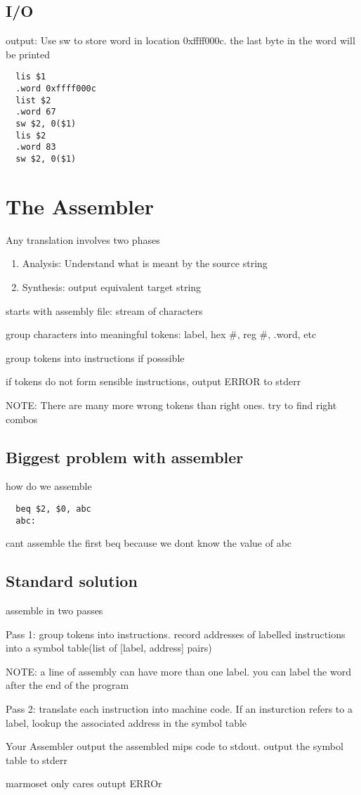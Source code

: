 \documentclass[11pt]{amsart}
\begin{document}
\subsection{I/O}
\par output:  Use sw to store word in location 0xffff000c. the last byte in the
word will be printed
\begin{verbatim}
  lis $1
  .word 0xffff000c
  list $2
  .word 67
  sw $2, 0($1)
  lis $2
  .word 83
  sw $2, 0($1)
\end{verbatim}
\section{The Assembler}
\par Any translation involves two phases
\begin{enumerate}
  \item Analysis: Understand what is meant by the source string
  \item Synthesis: output equivalent target string
\end{enumerate}
\par starts with assembly file: stream of characters
\begin{enumerate*}
\item group characters into meaningful tokens: label, hex #, reg #, .word, etc
\item group tokens into instructions if posssible
\item if tokens do not form sensible instructions, output ERROR to stderr
\item NOTE: There are many more wrong tokens than right ones. try to find right
  combos
\end {enumerate*}
\subsection{Biggest problem with assembler}
\par how do we assemble
\begin{verbatim}
  beq $2, $0, abc
  abc:
\end{verbatim}
\par cant assemble the first beq because we dont know the value of abc
\subsection{Standard solution}
\par assemble in two passes
\par Pass 1: group tokens into instructions. record addresses of labelled
instructions into a symbol table(list of [label, address] pairs)
\par NOTE: a line of assembly can have more than one label. you can label the
word after the end of the program
\par Pass 2: translate each instruction into machine code. If an insturction
refers to a label, lookup the associated address in the symbol table
\par Your Assembler output the assembled mips code to stdout. output the symbol
table to stderr
\par marmoset only cares outupt ERROr
\end{document}

